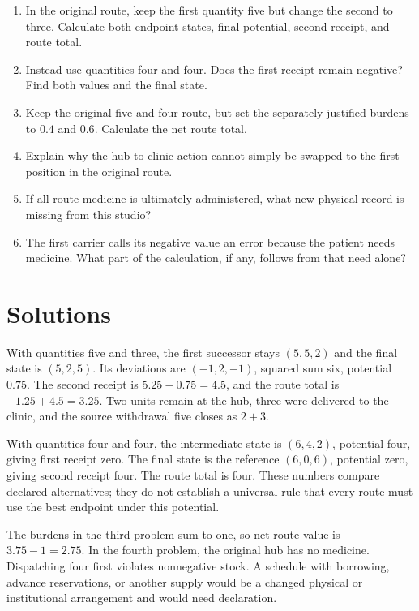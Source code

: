 \begin{enumerate}
\item In the original route, keep the first quantity five but change the second to three. Calculate both endpoint states, final potential, second receipt, and route total.
\item Instead use quantities four and four. Does the first receipt remain negative? Find both values and the final state.
\item Keep the original five-and-four route, but set the separately justified burdens to \(0.4\) and \(0.6\). Calculate the net route total.
\item Explain why the hub-to-clinic action cannot simply be swapped to the first position in the original route.
\item If all route medicine is ultimately administered, what new physical record is missing from this studio?
\item The first carrier calls its negative value an error because the patient needs medicine. What part of the calculation, if any, follows from that need alone?
\end{enumerate}

\section{Solutions}

With quantities five and three, the first successor stays \((5,5,2)\) and the final state is \((5,2,5)\). Its deviations are \((-1,2,-1)\), squared sum six, potential \(0.75\). The second receipt is \(5.25-0.75=4.5\), and the route total is \(-1.25+4.5=3.25\). Two units remain at the hub, three were delivered to the clinic, and the source withdrawal five closes as \(2+3\).

With quantities four and four, the intermediate state is \((6,4,2)\), potential four, giving first receipt zero. The final state is the reference \((6,0,6)\), potential zero, giving second receipt four. The route total is four. These numbers compare declared alternatives; they do not establish a universal rule that every route must use the best endpoint under this potential.

The burdens in the third problem sum to one, so net route value is \(3.75-1=2.75\). In the fourth problem, the original hub has no medicine. Dispatching four first violates nonnegative stock. A schedule with borrowing, advance reservations, or another supply would be a changed physical or institutional arrangement and would need declaration.

